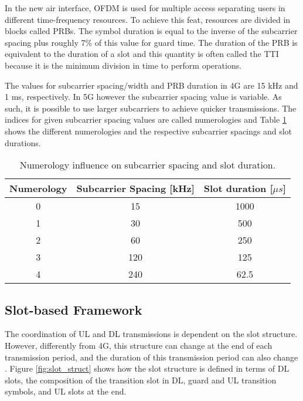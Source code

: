 In the new air interface, \ac{OFDM} is used for multiple access separating users in different time-frequency resources. To achieve this feat, resources are divided in blocks called \acp{PRB}.  The symbol duration is equal to the inverse of the subcarrier spacing plus roughly 7\% of this value for guard time. The duration of the PRB is equivalent to the duration of a slot and this quantity is often called the \ac{TTI} because it is the minimum division in time to perform operations. 

The values for subcarrier spacing/width and PRB duration in 4G are 15 kHz and 1 ms, respectively. In 5G however the subcarrier spacing value is variable. As such, it is possible to use larger subcarriers to achieve quicker transmissions. The indices for given subcarrier spacing values are called numerologies and Table \ref{tab:num} shows the different  numerologies and the respective subcarrier spacings and slot durations. 


\begin{table}[h]
    \centering
    \caption{Numerology influence on subcarrier spacing and slot duration.}
    \label{tab:num}
    \begin{tabular}{|c|c|c|}
    \hline
    Numerology & Subcarrier Spacing {[}kHz{]} & Slot duration {[}$\mu s${]} \\ \hline
    0          & 15                           & 1000                        \\ \hline
    1          & 30                           & 500                         \\ \hline
    2          & 60                           & 250                         \\ \hline
    3          & 120                          & 125                         \\ \hline
    4          & 240                          & 62.5                        \\ \hline
    \end{tabular}
\end{table}


\subsection*{Slot-based Framework}

The coordination of \ac{UL} and \ac{DL} transmissions is dependent on the slot structure. However, differently from 4G, this structure can change at the end of each transmission period, and the duration of this transmission period can also change \cite{3gpp_slot_periodicity}. Figure \ref{fig:slot_struct} shows how the slot structure is defined in terms of DL slots, the composition of the transition slot in DL, guard and UL transition symbols, and UL slots at the end.

